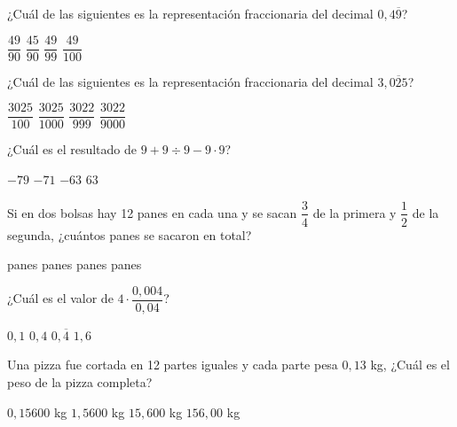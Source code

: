 \documentclass[spanish,letterpaper, 12pt, addpoints, answers]{exam}
\begin{document}
\begin{questions}
    \question[1] ¿Cuál de las siguientes es la representación fraccionaria del decimal $0,4\overline{9}$?
    \begin{choices}
        \choice $\dfrac{49}{90}$
        \CorrectChoice $\dfrac{45}{90}$
        \choice $\dfrac{49}{99}$
        \choice $\dfrac{49}{100}$
    \end{choices}
    \vspace{0.15in}

    \question[1] ¿Cuál de las siguientes es la representación fraccionaria del decimal $3,\overline{025}$?
    \begin{choices}
        \choice $\dfrac{3025}{100}$
        \choice $\dfrac{3025}{1000}$
        \CorrectChoice $\dfrac{3022}{999}$
        \choice $\dfrac{3022}{9000}$
    \end{choices}
    \vspace{0.15in}

    \question[1] ¿Cuál es el resultado de $9+9\div 9-9\cdot 9$?
    \begin{choices}
        \choice $-79$
        \CorrectChoice $-71$
        \choice $-63$
        \choice $63$
    \end{choices}
    \vspace{0.15in}

\newpage
    
    \question[1] Si en dos bolsas hay 12 panes en cada una y se sacan $\dfrac{3}{4}$ de la primera y $\dfrac{1}{2}$ de la segunda, ¿cuántos panes se sacaron en total?
    \begin{choices}
         panes
         panes
         panes
         panes
    \end{choices}
    \vspace{0.15in}

    \question[1] ¿Cuál es el valor de $4\cdot \dfrac{0,004}{0,04}$?
    \begin{choices}
        \choice $0,1$
        \CorrectChoice $0,4$
        \choice $0,\overline{4}$
        \choice $1,6$
    \end{choices}
    \vspace{0.15in}

    \question[1] Una pizza fue cortada en 12 partes iguales y cada parte pesa $0,13$ kg, ¿Cuál es el peso de la pizza completa?
    \begin{choices}
        \choice $0,15600$ kg
        \CorrectChoice $1,5600$ kg
        \choice $15,600$ kg
        \choice $156,00$ kg
    \end{choices}
    \vspace{0.15in}


\end{questions}
\end{document}
